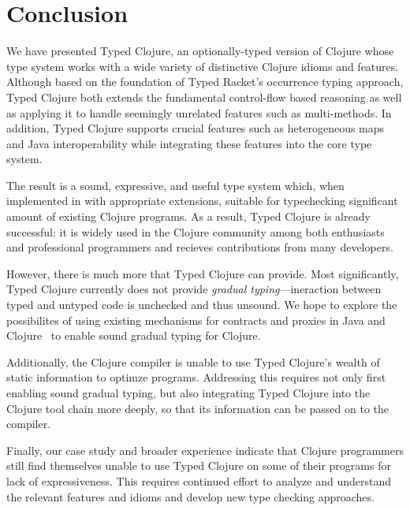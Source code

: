 \section{Conclusion}
\label{sec:conclusion}

We have presented Typed Clojure, an optionally-typed version of
Clojure whose type system works with a wide variety of distinctive
Clojure idioms and features. Although based on the foundation of Typed
Racket's occurrence typing approach, Typed Clojure both extends the
fundamental control-flow based reasoning as well as applying it to
handle seemingly unrelated features such as multi-methods. In
addition, Typed Clojure supports crucial features such as heterogeneous
maps and Java interoperability while integrating these features into
the core type system.

The result is a sound, expressive, and useful type system which, when
implemented in \coretyped with appropriate extensions, suitable for
typechecking significant amount of existing Clojure programs.
%
As a result, Typed Clojure is already successful: it is widely used in
the Clojure community among both enthusiasts and professional
programmers and recieves contributions from many developers.

However, there is much more that Typed Clojure can provide. Most
significantly, Typed Clojure currently does not provide \emph{gradual
  typing}---ineraction between typed and untyped code is unchecked and
thus unsound. We hope to explore the possibilites of using existing
mechanisms for contracts and proxies in Java and
Clojure~\cite{some-stuff} to enable sound gradual typing for Clojure.

Additionally, the Clojure compiler is unable to use Typed Clojure's
wealth of static information to optimze programs. Addressing this
requires not only first enabling sound gradual typing, but also
integrating Typed Clojure into the Clojure tool chain more deeply, so
that its information can be passed on to the compiler. 

Finally, our case study and broader experience indicate that Clojure
programmers still find themselves unable to use Typed Clojure on some
of their programs for lack of expressiveness. This requires continued
effort to analyze and understand the relevant features and idioms and
develop new type checking approaches.
